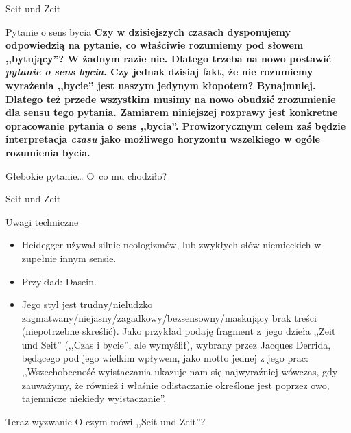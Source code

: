 \documentclass{beamer}  %
\begin{document}
\begin{frame}{Seit und Zeit}

  \begin{block}{Pytanie o sens bycia}
    \textbf{Czy w dzisiejszych czasach dysponujemy odpowiedzią na
      pytanie, co właściwie rozumiemy pod słowem ,,bytujący''? W
      żadnym razie nie. Dlatego trzeba na nowo postawić \emph{pytanie
        o sens bycia}. Czy jednak dzisiaj fakt, że nie rozumiemy
      wyrażenia ,,bycie'' jest naszym jedynym kłopotem? Bynajmniej.
      Dlatego też przede wszystkim musimy na nowo obudzić zrozumienie
      dla sensu tego pytania. Zamiarem niniejszej rozprawy jest
      konkretne opracowanie pytania o sens ,,bycia''. Prowizorycznym
      celem zaś będzie interpretacja \emph{czasu} jako możliwego
      horyzontu wszelkiego w ogóle rozumienia bycia.}
  \end{block}

  \begin{block}{Głebokie pytanie\ldots}
    O~co mu chodziło?
  \end{block}

\end{frame}



\begin{frame}{Seit und Zeit}

  \begin{block}{Uwagi techniczne}
    \begin{itemize}
    \item Heidegger używał silnie neologizmów, lub zwykłych słów
      niemieckich w zupełnie innym sensie.
    \item Przykład: Dasein.
    \item Jego styl jest trudny/nieludzko
      zagmatwany/niejasny/zagadkowy/bezsensowny/maskujący brak treści
      (niepotrzebne skreślić). Jako przykład podaję fragment z~jego
      dzieła ,,Zeit und Seit'' (,,Czas i bycie'', ale wymyślił),
      wybrany przez Jacques Derrida, będącego pod jego wielkim
      wpływem, jako motto jednej
      z jego prac: \\
      ,,Wszechobecność wyistaczania ukazuje nam się najwyraźniej
      wówczas, gdy zauważymy, że również i właśnie odistaczanie
      określone jest poprzez owo, tajemnicze niekiedy wyistaczanie''.
    \end{itemize}
    \pause
  \end{block}

  \begin{block}{Teraz wyzwanie}
    O czym mówi ,,Seit und Zeit''?
  \end{block}

\end{frame}
\end{document}
